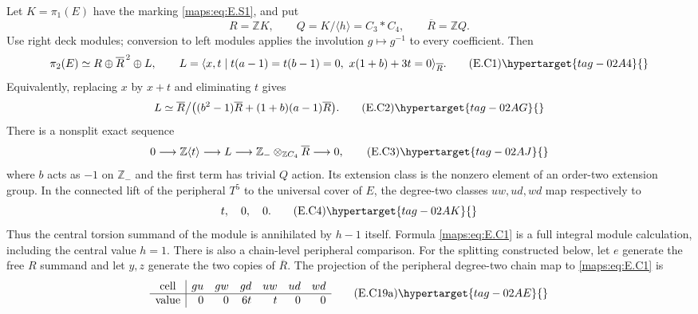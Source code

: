 \begin{theorem}\hypertarget{tag-02MG}{}\label{maps:src:E.2.16}


Let $K=\pi_1(E)$ have the marking \eqref{maps:eq:E.S1}, and put
\[
 R=\mathbb ZK,\qquad Q=K/\langle h\rangle=C_3*C_4,
 \qquad \overline R=\mathbb ZQ.
\]
Use right deck modules; conversion to left modules applies the
involution $g\mapsto g^{-1}$ to every coefficient. Then
\[
 \pi_2(E)\simeq R\oplus\overline R^{\,2}\oplus L,
 \qquad
 L=\langle x,t\mid t(a-1)=t(b-1)=0,
                         \ x(1+b)+3t=0\rangle_{\overline R}.
 \tag{E.C1}\hypertarget{tag-02A4}{}\label{maps:eq:E.C1}
\]
Equivalently, replacing $x$ by $x+t$ and eliminating $t$ gives
\[
 L\simeq\overline R\big/
       \big((b^2-1)\overline R+(1+b)(a-1)\overline R\big).
 \tag{E.C2}\hypertarget{tag-02AG}{}\label{maps:eq:E.C2}
\]
There is a nonsplit exact sequence
\[
 0\longrightarrow\mathbb Z\langle t\rangle
  \longrightarrow L\longrightarrow
  \mathbb Z_{-}\otimes_{\mathbb ZC_4}\overline R
  \longrightarrow0,
 \tag{E.C3}\hypertarget{tag-02AJ}{}\label{maps:eq:E.C3}
\]
where $b$ acts as $-1$ on $\mathbb Z_{-}$ and the first term
has trivial $Q$ action. Its extension class is the nonzero
element of an order-two extension group. In the connected
lift of the peripheral $T^5$ to the universal cover of $E$,
the degree-two classes $uw,ud,wd$ map respectively to
\[
                           t,\quad0,\quad0.
 \tag{E.C4}\hypertarget{tag-02AK}{}\label{maps:eq:E.C4}
\]
Thus the central torsion summand of the module is annihilated
by $h-1$ itself. Formula \eqref{maps:eq:E.C1} is a full integral module
calculation, including the central value $h=1$.  There is also a chain-level peripheral comparison.
For the splitting constructed below, let $e$ generate the
free $R$ summand and let $y,z$ generate the two copies of
$\overline R$. The projection of the peripheral degree-two
chain map to \eqref{maps:eq:E.C1} is
\[
 \begin{array}{c|rrrrrr}
 \text{cell}&gu&gw&gd&uw&ud&wd\\ \hline
 \text{value}&0&0&6t&t&0&0
 \end{array}
 \tag{E.C19a}\hypertarget{tag-02AE}{}\label{maps:eq:E.C19a}
\]
\end{theorem}
